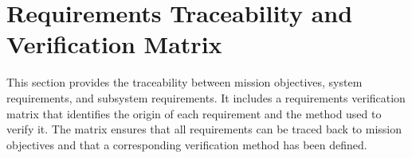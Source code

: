 \chapter{Requirements Traceability and Verification Matrix}

This section provides the traceability between mission objectives, system requirements, and subsystem requirements. It includes a requirements verification matrix that identifies the origin of each requirement and the method used to verify it.
The matrix ensures that all requirements can be traced back to mission objectives and that a corresponding verification method has been defined.
